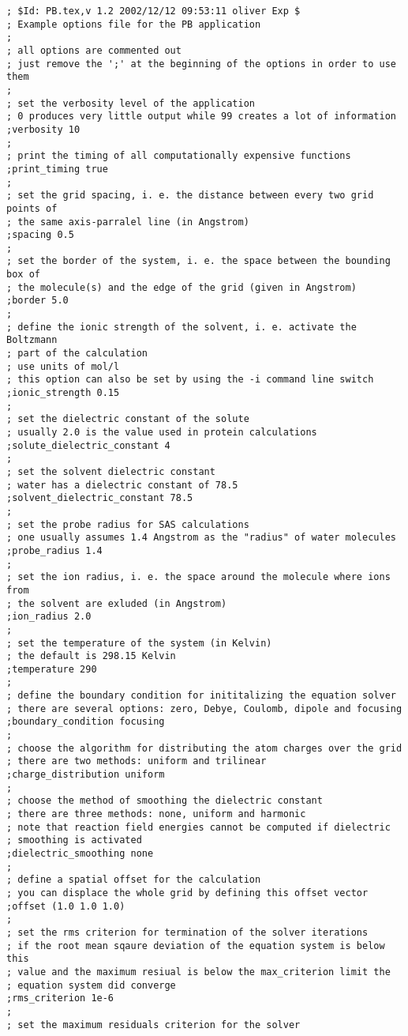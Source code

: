 \documentclass[12pt,twoside,a4paper]{article}
\begin{document}
\scriptsize
\begin{verbatim}
; $Id: PB.tex,v 1.2 2002/12/12 09:53:11 oliver Exp $
; Example options file for the PB application
;
; all options are commented out
; just remove the ';' at the beginning of the options in order to use them
;
; set the verbosity level of the application 
; 0 produces very little output while 99 creates a lot of information
;verbosity 10 
;
; print the timing of all computationally expensive functions
;print_timing true
;
; set the grid spacing, i. e. the distance between every two grid points of
; the same axis-parralel line (in Angstrom)
;spacing 0.5
;
; set the border of the system, i. e. the space between the bounding box of
; the molecule(s) and the edge of the grid (given in Angstrom)
;border 5.0
;
; define the ionic strength of the solvent, i. e. activate the Boltzmann
; part of the calculation
; use units of mol/l
; this option can also be set by using the -i command line switch
;ionic_strength 0.15
;
; set the dielectric constant of the solute
; usually 2.0 is the value used in protein calculations
;solute_dielectric_constant 4
;
; set the solvent dielectric constant
; water has a dielectric constant of 78.5
;solvent_dielectric_constant 78.5
;
; set the probe radius for SAS calculations
; one usually assumes 1.4 Angstrom as the "radius" of water molecules
;probe_radius 1.4
;
; set the ion radius, i. e. the space around the molecule where ions from
; the solvent are exluded (in Angstrom)
;ion_radius 2.0
;
; set the temperature of the system (in Kelvin)
; the default is 298.15 Kelvin
;temperature 290
;
; define the boundary condition for inititalizing the equation solver
; there are several options: zero, Debye, Coulomb, dipole and focusing
;boundary_condition focusing
;
; choose the algorithm for distributing the atom charges over the grid
; there are two methods: uniform and trilinear
;charge_distribution uniform
;
; choose the method of smoothing the dielectric constant
; there are three methods: none, uniform and harmonic
; note that reaction field energies cannot be computed if dielectric
; smoothing is activated
;dielectric_smoothing none
;
; define a spatial offset for the calculation
; you can displace the whole grid by defining this offset vector
;offset (1.0 1.0 1.0)
;
; set the rms criterion for termination of the solver iterations
; if the root mean sqaure deviation of the equation system is below this
; value and the maximum resiual is below the max_criterion limit the
; equation system did converge
;rms_criterion 1e-6
;
; set the maximum residuals criterion for the solver

\end{verbatim}
\end{document}
